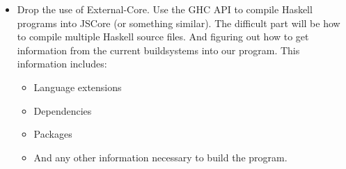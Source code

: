 \begin{itemize}

\item Drop the use of External-Core. Use the GHC API to compile Haskell programs
into JSCore (or something similar). The difficult part will be how to compile
multiple Haskell source files. And figuring out how to get information from the
current buildsystems into our program. This information includes:

\begin{itemize}

\item Language extensions
\item Dependencies
\item Packages
\item And any other information necessary to build the program.

\end{itemize}

\end{itemize}


